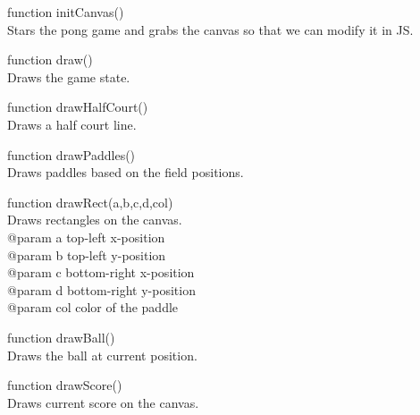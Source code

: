 \documentclass[12pt]{article}
\newenvironment{itemize*}%
  {\begin{itemize}%
  	\setlength{\parsep}{0pt}
    \setlength{\itemsep}{0pt}%
    \setlength{\parskip}{0pt}}%
  {\end{itemize}}
\begin{document}
\begin{itemize*}
\item function initCanvas()\\
Stars the pong game and grabs the canvas so that we can modify it in JS.
\item function draw()\\
Draws the game state.
\item function drawHalfCourt() \\
Draws a half court line.
\item function drawPaddles()\\
Draws paddles based on the field positions.
\item function drawRect(a,b,c,d,col)\\
Draws rectangles on the canvas.\\
@param a top-left x-position\\
@param b top-left y-position\\
@param c bottom-right x-position\\
@param d bottom-right y-position\\
@param col color of the paddle
\item function drawBall()\\
Draws the ball at current position.
\item function drawScore()\\
Draws current score on the canvas.
\end{itemize*}
\end{document}
